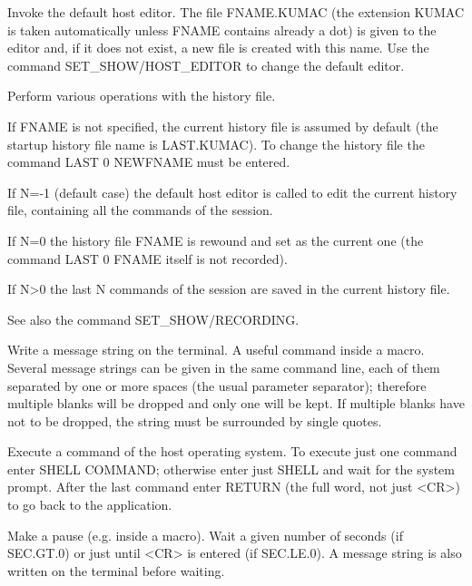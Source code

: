 \BEGARG
{}
\ENDARG
\BEGTEXT
Invoke the default host editor.
The file FNAME.KUMAC (the extension KUMAC is taken automatically
unless FNAME contains already a dot) is given to the editor and,
if it does not exist, a new file is created with this name.
Use the command SET\_SHOW/HOST\_EDITOR to change the default editor.
\ENDTEXT

\BEGARG
{}
\ENDARG
\BEGTEXT
Perform various operations with the history file.

If FNAME is not specified, the current history file is assumed by default
(the startup history file name is LAST.KUMAC).
To change the history file the command LAST 0 NEWFNAME must be entered.

If N=-1 (default case) the default host editor is called
to edit the current history file, containing all the commands of the session.

If N=0 the history file FNAME is rewound and set as the current one
(the command LAST 0 FNAME itself is not recorded).

If N>0 the last N commands of the session are saved in the
current history file.

See also the command SET\_SHOW/RECORDING.
\ENDTEXT

\BEGARG
{}
\ENDARG
\BEGTEXT
Write a message string on the terminal.
A useful command inside a macro.
Several message strings can be given in the same command line,
each of them separated by one or more spaces
(the usual parameter separator);
therefore multiple blanks will be dropped
and only one will be kept.
If multiple blanks have not to be dropped,
the string must be surrounded by single quotes.
\ENDTEXT

\BEGARG
{}
\ENDARG
\BEGTEXT
Execute a command of the host operating system.
To execute just one command enter SHELL COMMAND;
otherwise enter just SHELL and wait for the system prompt.
After the last command enter RETURN (the full word, not just <CR>)
to go back to the application.
\ENDTEXT

\BEGARG
{}
\ENDARG
\BEGTEXT
Make a pause (e.g. inside a macro).
Wait a given number of seconds (if SEC.GT.0)
or just until <CR> is entered (if SEC.LE.0).
A message string is also written on the terminal before waiting.
\ENDTEXT

